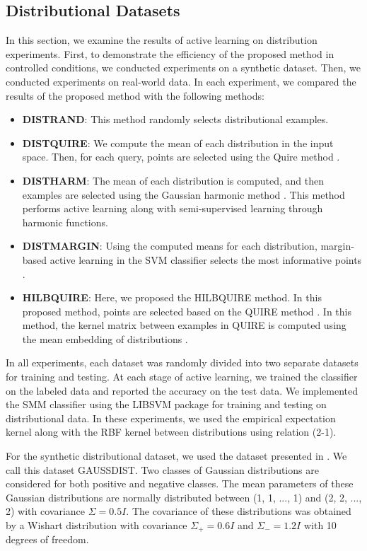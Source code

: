 	\subsection{Distributional Datasets}
	In this section, we examine the results of active learning on distribution experiments. First, to demonstrate the efficiency of the proposed method in controlled conditions, we conducted experiments on a synthetic dataset. Then, we conducted experiments on real-world data. In each experiment, we compared the results of the proposed method with the following methods:
	\begin{itemize}
		\item \textbf{DISTRAND}: This method randomly selects distributional examples.
		\item \textbf{DISTQUIRE}: We compute the mean of each distribution in the input space. Then, for each query, points are selected using the Quire method \cite{huang2014active}.
		\item \textbf{DISTHARM}: The mean of each distribution is computed, and then examples are selected using the Gaussian harmonic method \cite{zhu2003semi}. This method performs active learning along with semi-supervised learning through harmonic functions.
		\item \textbf{DISTMARGIN}: Using the computed means for each distribution, margin-based active learning in the SVM classifier selects the most informative points \cite{scheffer2001active}.
		\item \textbf{HILBQUIRE}: Here, we proposed the HILBQUIRE method. In this proposed method, points are selected based on the QUIRE method \cite{huang2014active}. In this method, the kernel matrix between examples in QUIRE is computed using the mean embedding of distributions \cite{muandet2012domain}.
	\end{itemize}
	
	In all experiments, each dataset was randomly divided into two separate datasets for training and testing. At each stage of active learning, we trained the classifier on the labeled data and reported the accuracy on the test data. We implemented the SMM classifier \cite{sriperumbudur2009kernel} using the LIBSVM package \cite{chang2011libsvm} for training and testing on distributional data. In these experiments, we used the empirical expectation kernel along with the RBF kernel between distributions using relation (2-1).
	
	For the synthetic distributional dataset, we used the dataset presented in \cite{sriperumbudur2009kernel}. We call this dataset GAUSSDIST. Two classes of Gaussian distributions are considered for both positive and negative classes. The mean parameters of these Gaussian distributions are normally distributed between (1, 1, ..., 1) and (2, 2, ..., 2) with covariance $\Sigma = 0.5 I$. The covariance of these distributions was obtained by a Wishart distribution with covariance $\Sigma_+ = 0.6 I$ and $\Sigma_- = 1.2 I$ with 10 degrees of freedom.
	
